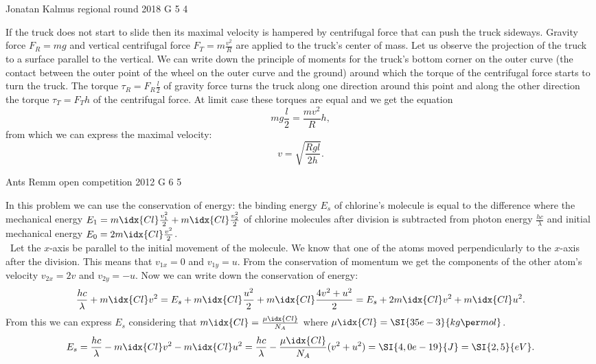 \documentclass[11pt]{article}
\begin{document}
{Jonatan Kalmus} %
{regional round} %
{2018} %
{G 5} %
{4} %
{

\ifEngSolution
If the truck does not start to slide then its maximal velocity is hampered by centrifugal force that can push the truck sideways. Gravity force $F_R=mg$ and vertical centrifugal force $F_T=m\frac{v^2}{R}$ are applied to the truck’s center of mass. Let us observe the projection of the truck to a surface parallel to the vertical. We can write down the principle of moments for the truck’s bottom corner on the outer curve (the contact between the outer point of the wheel on the outer curve and the ground) around which the torque of the centrifugal force starts to turn the truck. The torque $\tau_R=F_R\frac{l}{2}$ of gravity force turns the truck along one direction around this point and along the other direction the torque $\tau_T=F_T h$ of the centrifugal force. At limit case these torques are equal and we get the equation
$$mg\frac{l}{2}=\frac{mv^2}{R}h,$$ 
from which we can express the maximal velocity:
$$v=\sqrt{\frac{Rgl}{2h}}.$$
\fi
}

{Ants Remm} %
{open competition} %
{2012} %
{G 6} %
{5} %
{

\ifEngSolution
In this problem we can use the conservation of energy: the binding energy $E_s$ of chlorine’s molecule is equal to the difference where the mechanical energy $E_1 = m\idx{Cl} \frac{v_1^2}{2} + m\idx{Cl} \frac{v_2^2}{2}$ of chlorine molecules after division is subtracted from photon energy $\frac{hc}{\lambda}$ and initial mechanical energy $E_0 = 2m\idx{Cl} \frac{v^2}{2} $.\\\    
Let the $x$-axis be parallel to the initial movement of the molecule. We know that one of the atoms moved perpendicularly to the $x$-axis after the division. This means that $v_{1x} = 0$ and $v_{1y} = u$. From the conservation of momentum we get the components of the other atom’s velocity $v_{2x} = 2 v$ and $v_{2y} = -u$. Now we can write down the conservation of energy:
$$
	\frac{hc}{\lambda} + m\idx{Cl} v^2  = E_s + m\idx{Cl} \frac{u^2}{2} + m\idx{Cl} \frac{4v^2 + u^2}{2} = E_s + 2 m\idx{Cl} v^2 + m\idx{Cl} u^2.
$$ 
From this we can express $E_s$ considering that $m\idx{Cl} = \frac{\mu\idx{Cl}}{N_A}$ where $\mu\idx{Cl} = \SI{35e-3}{kg\per mol}$.
$$ E_s = \frac{hc}{\lambda} - m\idx{Cl} v^2 - m\idx{Cl} u^2 = \frac{hc}{\lambda} - \frac{\mu\idx{Cl}}{N_A} (v^2 + u^2) = \SI{4,0e-19}{J} = \SI{2,5}{eV}.
$$
\fi
}
\end{document}
